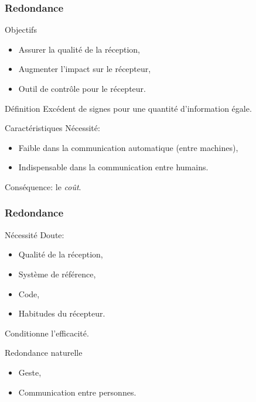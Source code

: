 \begin{frame}
	\frametitle{Redondance}
	\begin{block}{Objectifs}
		\begin{itemize}
			\item Assurer la qualité de la réception,
			\item Augmenter l'impact sur le récepteur,
			\item Outil de contrôle pour le récepteur.
		\end{itemize}
	\end{block}
	\begin{exampleblock}{Définition}
		Excédent de signes pour une quantité d'information égale.
	\end{exampleblock}
	\begin{block}{Caractéristiques}
		Nécessité:
		\begin{itemize}
			\item Faible dans la communication automatique (entre machines),
			\item Indispensable dans la communication entre humains.
		\end{itemize}

		Conséquence: le \emph{coût}.
	\end{block}
\end{frame}
\begin{frame}
	\frametitle{Redondance}
	\begin{block}{Nécessité}
		Doute:
		\begin{itemize}
			\item Qualité de la réception,
			\item Système de référence,
			\item Code,
			\item Habitudes du récepteur.
		\end{itemize}

		Conditionne l'efficacité.
	\end{block}
	\begin{exampleblock}{Redondance naturelle}
		\begin{itemize}
			\item Geste,
			\item Communication entre personnes.
		\end{itemize}
	\end{exampleblock}
\end{frame}
